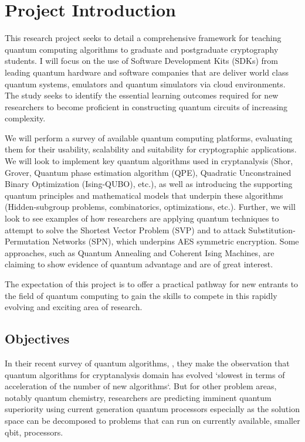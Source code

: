 \documentclass[11pt,a4paper]{article}
\begin{document}
\section{Project Introduction}

This research project seeks to detail a comprehensive framework for teaching quantum computing algorithms to
graduate and postgraduate cryptography students.
I will focus on the use of Software Development Kits (SDKs) from leading quantum hardware and software companies
that are deliver world class quantum systems, emulators and quantum simulators via cloud environments.
The study seeks to identify the essential learning outcomes required for new researchers to become proficient
in constructing quantum circuits of increasing complexity.

We will perform a survey of available quantum computing platforms, evaluating them for their usability, scalability
and suitability for cryptographic applications.  We will look to implement key quantum algorithms used in
cryptanalysis (Shor, Grover, Quantum phase estimation algorithm (QPE), Quadratic Unconstrained Binary Optimization 
(Ising-QUBO), etc.), as well as introducing the supporting quantum principles and
mathematical models that underpin these algorithms (Hidden-subgroup problems, combinatorics, optimizations, etc.). 
Further, we will look to see examples of how researchers are applying quantum techniques to attempt to solve the 
Shortest Vector Problem (SVP) and to attack Substitution-Permutation Networks (SPN), which underpins AES symmetric 
encryption.
Some approaches, such as Quantum Annealing and Coherent Ising Machines, are claiming to show evidence of quantum 
advantage and are of great interest.

The expectation of this project is to offer a practical pathway for new entrants to the field of quantum computing
to gain the skills to compete in this rapidly evolving and exciting area of research.

\subsection{Objectives}

In their recent survey of quantum algorithms, , \citeauthor{Arnault:2024} \cite{Arnault:2024} 
they make the observation
that quantum algorithms for cryptanalysis domain has evolved `slowest in terms of acceleration of the number of new 
algorithms`.  But for other problem areas, notably quantum chemistry, researchers are predicting imminent quantum superiority 
using current generation quantum processors \cite{Qunova:2024} especially as the solution space can be decomposed to problems 
that can run on currently available, smaller qbit, processors.
\end{document}
